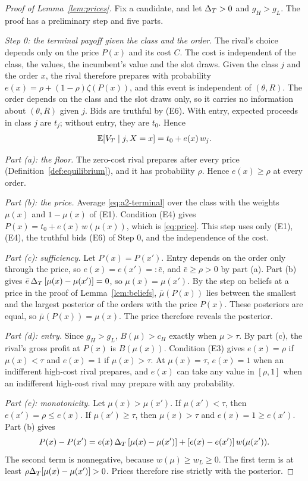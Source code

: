 \begin{proof}[Proof of Lemma~\ref{lem:prices}]
Fix a candidate, and let \(\Delta_T>0\) and \(g_H>g_L\). The proof has a preliminary step and five parts.

\emph{Step 0: the terminal payoff given the class and the order.} The rival's choice depends only on the
price \(P(x)\) and its cost \(C\). The cost is independent of the class, the values, the incumbent's value and the
slot draws. Given the class \(j\) and the order \(x\), the rival therefore prepares with probability
\(e(x)=\rho+(1-\rho)\zeta(P(x))\), and this event is independent of \((\theta,R)\). The order depends on the class
and the slot draws only, so it carries no information about \((\theta,R)\) given \(j\). Bids are truthful by (E6).
With entry, expected proceeds in class \(j\) are \(t_j\); without entry, they are \(t_0\). Hence
\begin{equation}\label{eq:a2-terminal}
\mathbb{E}[V_T\mid j,X=x]=t_0+e(x)\,w_j .
\end{equation}

\emph{Part (a): the floor.} The zero-cost rival prepares after every price (Definition~\ref{def:equilibrium}),
and it has probability \(\rho\). Hence \(e(x)\ge\rho\) at every order.

\emph{Part (b): the price.} Average \eqref{eq:a2-terminal} over the class with the weights \(\mu(x)\) and
\(1-\mu(x)\) of (E1). Condition (E4) gives \(P(x)=t_0+e(x)\,w(\mu(x))\), which is \eqref{eq:price}. This step uses
only (E1), (E4), the truthful bids (E6) of Step 0, and the independence of the cost.

\emph{Part (c): sufficiency.} Let \(P(x)=P(x')\). Entry depends on the order only through the price, so
\(e(x)=e(x')=:\bar e\), and \(\bar e\ge\rho>0\) by part (a). Part (b) gives \(\bar e\,\Delta_T\,[\mu(x)-\mu(x')]=0\), so
\(\mu(x)=\mu(x')\). By the step on beliefs at a price in the proof of Lemma~\ref{lem:beliefs}, \(\bar\mu(P(x))\)
lies between the smallest and the largest posterior of the orders with the price \(P(x)\). These posteriors are
equal, so \(\bar\mu(P(x))=\mu(x)\). The price therefore reveals the posterior.

\emph{Part (d): entry.} Since \(g_H>g_L\), \(B(\mu)>c_H\) exactly when \(\mu>\tau\). By part (c), the
rival's gross profit at \(P(x)\) is \(B(\mu(x))\). Condition (E3) gives \(e(x)=\rho\) if \(\mu(x)<\tau\) and
\(e(x)=1\) if \(\mu(x)>\tau\). At \(\mu(x)=\tau\), \(e(x)=1\) when an indifferent high-cost rival prepares, and \(e(x)\) can take any value in
\([\rho,1]\) when an indifferent high-cost rival may prepare with any probability.

\emph{Part (e): monotonicity.} Let \(\mu(x)>\mu(x')\). If \(\mu(x')<\tau\), then \(e(x')=\rho\le e(x)\). If
\(\mu(x')\ge\tau\), then \(\mu(x)>\tau\) and \(e(x)=1\ge e(x')\). Part (b) gives
\begin{equation}\label{eq:a2-increment}
P(x)-P(x')=e(x)\,\Delta_T\,[\mu(x)-\mu(x')]+[e(x)-e(x')]\,w(\mu(x')) .
\end{equation}
The second term is nonnegative, because \(w(\mu)\ge w_L\ge0\). The first term is at least
\(\rho\Delta_T[\mu(x)-\mu(x')]>0\). Prices therefore rise strictly with the posterior.
\end{proof}


